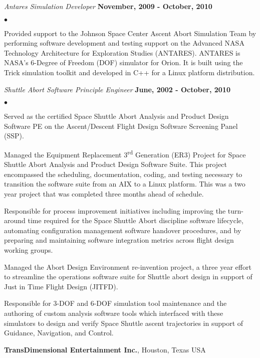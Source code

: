 \documentclass[margin,line]{res}
\newenvironment{list2}{
  \begin{list}{$\bullet$}{%
      \setlength{\itemsep}{0in}
      \setlength{\parsep}{0in} \setlength{\parskip}{0in}
      \setlength{\topsep}{0in} \setlength{\partopsep}{0in} 
      \setlength{\leftmargin}{0.2in}}}{\end{list}}
\begin{document}
\begin{resume}
\vspace{-.4cm}
{\em Antares Simulation Developer} \hfill {\bf November, 2009 - October, 2010}
\vspace*{.05in}
\begin{list2}
\item Provided support to the Johnson Space Center Ascent Abort Simulation Team by performing software development and testing support on the Advanced NASA Technology Architecture for Exploration Studies (ANTARES).  ANTARES is NASA's 6-Degree of Freedom (DOF) simulator for Orion.  It is built using the Trick simulation toolkit and developed in C++ for a Linux platform distribution.
\end{list2}
{\em Shuttle Abort Software Principle Engineer} \hfill {\bf June, 2002 - October, 2010}
\vspace*{.05in}
\begin{list2}
\item Served as the certified Space Shuttle Abort Analysis and Product Design Software PE on the Ascent/Descent Flight Design Software Screening Panel (SSP).
\item Managed the Equipment Replacement 3\textsuperscript{rd} Generation (ER3) Project for Space Shuttle Abort Analysis and Product Design Software Suite.  This project encompassed the scheduling, documentation, coding, and testing necessary to transition the software suite from an AIX to a Linux platform.  This was a two year project that was completed three months ahead of schedule.
\item Responsible for process improvement initiatives including improving the turn-around time required for the Space Shuttle Abort discipline software lifecycle, automating configuration management software handover procedures, and by preparing and maintaining software integration metrics across flight design working groups.
\item Managed the Abort Design Environment re-invention project, a three year effort to streamline the operations software suite for Shuttle abort design in support of Just in Time Flight Design (JITFD).
\item Responsible for 3-DOF and 6-DOF simulation tool maintenance and the authoring of custom analysis software tools which interfaced with these simulators to design and verify Space Shuttle ascent trajectories in support of Guidance, Navigation, and Control.
\end{list2}
{\bf TransDimensional Entertainment Inc.}, Houston, Texas USA


\end{resume}
\end{document}
